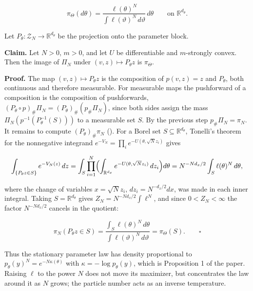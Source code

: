 \documentclass[11pt,a4paper]{report}
\begin{document}
\[\pi_\Theta(d\theta)=\frac{\ell(\theta)^N}{\int\ell(\vartheta)^N\,d\vartheta}\,d\theta\qquad\text{on }\mathbb R^{d_\theta}.\]


Let \(P_\theta:\mathcal Z_N\to\mathbb R^{d_\theta}\) be the projection onto the parameter block.




\textbf{Claim.} Let \(N>0\), \(m>0\), and let \(U\) be differentiable and \(m\)-strongly convex. Then the image of \(\Pi_N\) under \((v,z)\mapsto P_\theta z\) is \(\pi_\Theta\).




\textbf{Proof.} The map \((v,z)\mapsto P_\theta z\) is the composition of \(p(v,z)=z\) and \(P_\theta\), both continuous and therefore measurable. For measurable maps the pushforward of a composition is the composition of pushforwards, \((P_\theta\circ p)_\#\Pi_N=(P_\theta)_\#(p_\#\Pi_N)\), since both sides assign the mass \(\Pi_N(p^{-1}(P_\theta^{-1}(S)))\) to a measurable set \(S\). By the previous step \(p_\#\Pi_N=\pi_N\). It remains to compute \((P_\theta)_\#\pi_N\) (\cite[Section~3.9.9]{LangevinLean2026IPLA}). For a Borel set \(S\subseteq\mathbb R^{d_\theta}\), Tonelli's theorem for the nonnegative integrand \(e^{-V_N}=\prod_ie^{-U(\theta,\sqrt Nz_i)}\) gives


\[\int_{\{P_\theta z\in S\}}e^{-V_N(z)}\,dz=\int_S\prod_{i=1}^N\Bigl(\int_{\mathbb R^{d_x}}e^{-U(\theta,\sqrt Nz_i)}\,dz_i\Bigr)d\theta=N^{-Nd_x/2}\int_S\ell(\theta)^N\,d\theta,\]


where the change of variables \(x=\sqrt Nz_i\), \(dz_i=N^{-d_x/2}dx\), was made in each inner integral. Taking \(S=\mathbb R^{d_\theta}\) gives \(Z_N=N^{-Nd_x/2}\int\ell^N\), and since \(0<Z_N<\infty\) the factor \(N^{-Nd_x/2}\) cancels in the quotient:


\[\pi_N(P_\theta z\in S)=\frac{\int_S\ell(\theta)^N\,d\theta}{\int\ell(\vartheta)^N\,d\vartheta}=\pi_\Theta(S).\qquad\square\]


Thus the stationary parameter law has density proportional to \(p_\theta(y)^N=e^{-N\kappa(\theta)}\) with \(\kappa=-\log p_\theta(y)\), which is Proposition 1 of the paper. Raising \(\ell\) to the power \(N\) does not move its maximizer, but concentrates the law around it as \(N\) grows; the particle number acts as an inverse temperature.
\end{document}
